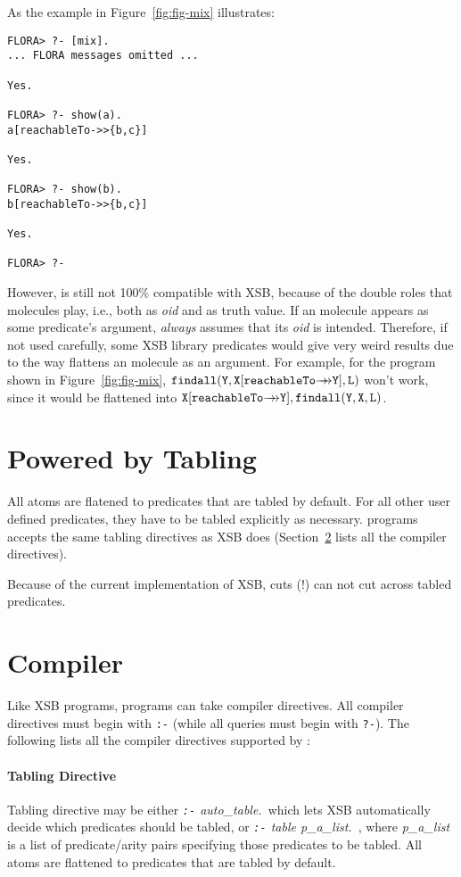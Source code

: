 \documentclass[11pt]{report}
\begin{document}
As the example in Figure~\ref{fig:fig-mix} illustrates:
\begin{verbatim}
FLORA> ?- [mix].
... FLORA messages omitted ...

Yes.

FLORA> ?- show(a).
a[reachableTo->>{b,c}]

Yes.

FLORA> ?- show(b).
b[reachableTo->>{b,c}]

Yes.

FLORA> ?-
\end{verbatim}

However, \FLORA is still not 100\% compatible with XSB, because of the double roles that
\mbox{\fl} molecules play, i.e., both as \emph{oid} and as truth value. If an \fl molecule
appears as some predicate's argument, \FLORA \emph{always} assumes that its \emph{oid} is
intended. Therefore, if not used carefully, some XSB library predicates would give very
weird results due to the way \FLORA flattens an \fl molecule as an argument. For
example, for the \FLORA program shown in Figure~\ref{fig:fig-mix},
$\mathtt{findall(Y,X[reachableTo{{\rightarrow\!\!\!\!\rightarrow}}Y],L)}$ won't work, since it would be flattened
into \linebreak $\mathtt{X[reachableTo{{\rightarrow\!\!\!\!\rightarrow}}Y],findall(Y,X,L)}$.

\section{Powered by Tabling}

All \fl atoms are flatened to predicates that are tabled by default. For all other user
defined predicates, they have to be tabled explicitly as necessary. \FLORA programs accepts
the same tabling directives as XSB does (Section~\ref{sec-comp-directives} lists all the
compiler directives).

Because of the current implementation of XSB, cuts (!) can not cut across tabled predicates.

\section{\FLORA Compiler} \label{sec-comp-directives}

Like XSB programs, \FLORA programs can take compiler directives. All compiler directives must
begin with {\tt :-} (while all queries must begin with {\tt ?-}). The following lists all the
compiler directives supported by \FLORA:

\paragraph{Tabling Directive} Tabling directive may be either \emph{{\tt :-} auto\_table.}\ 
which lets XSB automatically decide which predicates should be tabled, or
\emph{{\tt :-} table p\_a\_list.}\ , where \emph{p\_a\_list} is a list of \mbox{predicate/arity}
pairs specifying those predicates to be tabled. All \fl atoms are flattened to predicates that
are tabled by default.
\end{document}

